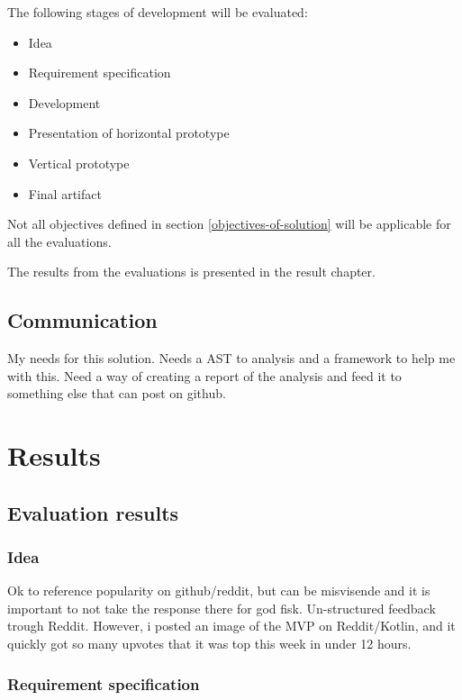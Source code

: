 \documentclass{report}
\begin{document}
The following stages of development will be evaluated: 
\begin{itemize}
    \item Idea 
    \item Requirement specification
    \item Development
    \item Presentation of horizontal prototype
    \item Vertical prototype
    \item Final artifact
\end{itemize}


Not all objectives defined in section \ref{objectives-of-solution} will be applicable for all the evaluations.

The results from the evaluations is presented in the result chapter.


\section{Communication}


My needs for this solution. Needs a AST to analysis and a framework to help me with this. Need a way of creating a report of the analysis and feed it to something else that can post on github. 


\chapter{Results}


\section{Evaluation results}

\subsection{Idea}
Ok to reference popularity on github/reddit, but can be misvisende and it is important to not take the response there for god fisk.
Un-structured feedback trough Reddit. However, i posted an image of the MVP on Reddit/Kotlin, and it quickly got so many upvotes that it was top this week in under 12 hours. 

\subsection{Requirement specification}
\end{document}

